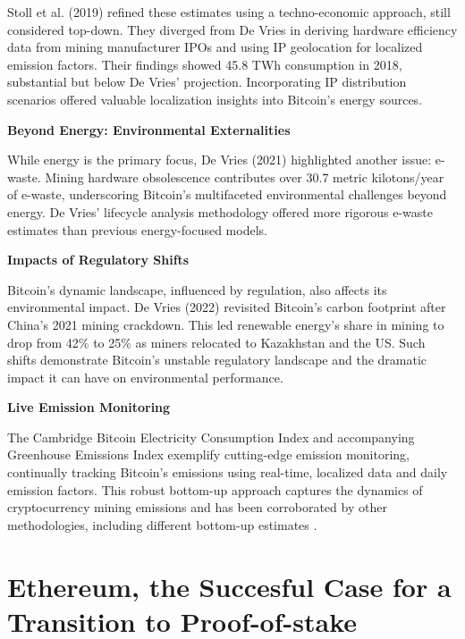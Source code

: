 \documentclass[11pt]{report}
\begin{document}
Stoll et al. (2019) \cite{stollCarbonFootprintBitcoin2019} refined these estimates using a techno-economic approach, still considered top-down. They diverged from De Vries in deriving hardware efficiency data from mining manufacturer IPOs and using IP geolocation for localized emission factors. Their findings showed 45.8 TWh consumption in 2018, substantial but below De Vries' projection. Incorporating IP distribution scenarios offered valuable localization insights into Bitcoin's energy sources.

\textbf{Beyond Energy: Environmental Externalities}

While energy is the primary focus, De Vries (2021) \cite{devriesBitcoinGrowingEwaste2021} highlighted another issue: e-waste. Mining hardware obsolescence contributes over 30.7 metric kilotons/year of e-waste, underscoring Bitcoin's multifaceted environmental challenges beyond energy. De Vries' lifecycle analysis methodology offered more rigorous e-waste estimates than previous energy-focused models.

\textbf{Impacts of Regulatory Shifts}


Bitcoin's dynamic landscape, influenced by regulation, also affects its environmental impact. De Vries (2022)\cite{devriesRevisitingBitcoinCarbon2022}  revisited Bitcoin's carbon footprint after China's 2021 mining crackdown. This led renewable energy's share in mining to drop from 42\% to 25\% as miners relocated to Kazakhstan and the US. Such shifts demonstrate Bitcoin's unstable regulatory landscape and the dramatic impact it can have on environmental performance.

\textbf{Live Emission Monitoring}

The Cambridge Bitcoin Electricity Consumption Index \cite{neumuellerCambridgeBitcoinElectricity2021} and accompanying Greenhouse Emissions Index
exemplify cutting-edge emission monitoring, continually tracking Bitcoin's emissions using real-time, localized data and daily emission factors. This robust bottom-up approach captures the dynamics of cryptocurrency mining emissions and has been corroborated by other methodologies, including different bottom-up estimates \cite{mcdonaldEthereumEmissionsBottomup2022}.

\section{Ethereum, the Succesful Case for a Transition to Proof-of-stake \label{sec:ethereum_transition}}
\end{document}
